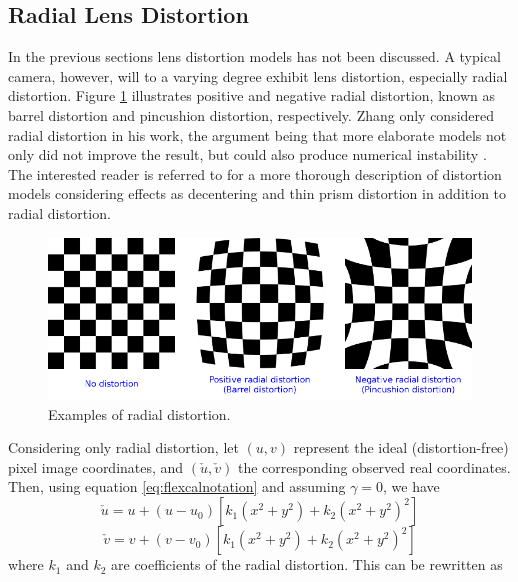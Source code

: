 \subsection{Radial Lens Distortion}
In the previous sections lens distortion models has not been discussed. A typical camera, however, will to a varying degree exhibit lens distortion, especially radial distortion. Figure \ref{fig:distortion} illustrates positive and negative radial distortion, known as barrel distortion and pincushion distortion, respectively. Zhang only considered radial distortion in his work, the argument being that more elaborate models not only did not improve the result, but could also produce numerical instability \cite{zhangTech}.
The interested reader is referred to \cite{wengCalibration, weiCalibration, Brown71close-rangecamera} for a more thorough description of distortion models considering effects as decentering and thin prism distortion in addition to radial distortion.
\begin{figure}[H]
    \centering
    \includegraphics[width=\linewidth]{fig/distortion_examples.png}
    \caption{Examples of radial distortion. \protect\footnotemark}
    \label{fig:distortion}
\end{figure}
Considering only radial distortion, let $(u,v)$ represent the ideal (distortion-free) pixel image coordinates, and $(\check{u},\check{v})$ the corresponding observed real coordinates. Then, using equation \ref{eq:flexcalnotation} and assuming $\gamma = 0$, we have \cite{zhangTech}
\begin{equation}
\label{eq:dist_u}
    \check{u}=u+(u-u_0)[k_1(x^2+y^2)+k_2(x^2+y^2)^2]
\end{equation}
\begin{equation}
\label{eq:dist_v}
    \check{v}=v+(v-v_0)[k_1(x^2+y^2)+k_2(x^2+y^2)^2]
\end{equation}
where $k_1$ and $k_2$ are coefficients of the radial distortion. This can be rewritten as 
